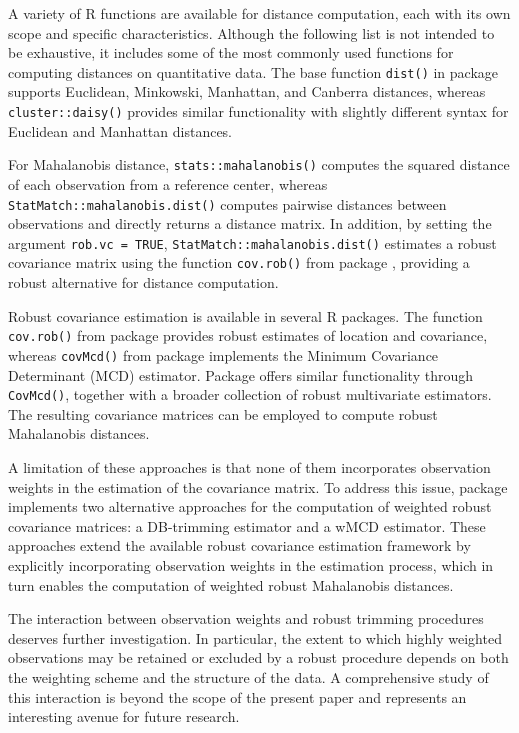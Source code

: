 A variety of R functions are available for distance computation, each with its own scope and specific characteristics. Although the following list is not intended to be exhaustive, it includes some of the most commonly used functions for computing distances on quantitative data. The base function \texttt{dist()} in package  supports Euclidean, Minkowski, Manhattan, and Canberra distances, whereas \texttt{cluster::daisy()} provides similar functionality with slightly different syntax for Euclidean and Manhattan distances.

For Mahalanobis distance, \texttt{stats::mahalanobis()} computes the squared distance of each observation from a reference center, whereas \texttt{StatMatch::mahalanobis.dist()} computes pairwise distances between observations and directly returns a distance matrix. In addition, by setting the argument \texttt{rob.vc = TRUE}, \texttt{StatMatch::mahalanobis.dist()} estimates a robust covariance matrix using the function \texttt{cov.rob()} from package  \citep{Venables2002}, providing a robust alternative for distance computation.

Robust covariance estimation is available in several R packages. The function \texttt{cov.rob()} from package   provides robust estimates of location and covariance, whereas \texttt{covMcd()} from package  \citep{robustbase} implements the Minimum Covariance Determinant (MCD) estimator. Package  \citep{rrcov} offers similar functionality through \texttt{CovMcd()}, together with a broader collection of robust multivariate estimators. The resulting covariance matrices can be employed to compute robust Mahalanobis distances.

A limitation of these approaches is that none of them incorporates observation weights in the estimation of the covariance matrix. To address this issue, package  implements two alternative approaches for the computation of weighted robust covariance matrices: a DB-trimming estimator and a wMCD estimator. These approaches extend the available robust covariance estimation framework by explicitly incorporating observation weights in the estimation process, which in turn enables the computation of weighted robust Mahalanobis distances.

The interaction between observation weights and robust trimming procedures deserves further investigation. In particular, the extent to which highly weighted observations may be retained or excluded by a robust procedure depends on both the weighting scheme and the structure of the data. A comprehensive study of this interaction is beyond the scope of the present paper and represents an interesting avenue for future research.

